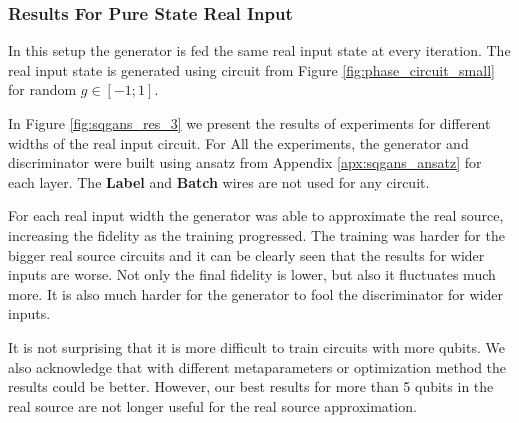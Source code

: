 \subsubsection{Results For Pure State Real Input}
In this setup the generator is fed the same real input state at every iteration.
The real input state is generated using circuit from Figure
\ref{fig:phase_circuit_small} for random $g \in [-1; 1]$.


In Figure \ref{fig:sqgans_res_3} we present the
results of experiments for different widths of the real input circuit. For All
the experiments, the generator and discriminator were built using ansatz
from Appendix \ref{apx:sqgans_ansatz} for each layer. The \textbf{Label} and
\textbf{Batch} wires are not used for any circuit.

For each real input width the generator was able to approximate the real source,
increasing the fidelity as the training progressed. The training was
harder for the bigger real source circuits and it can be clearly seen that
the results for wider inputs are worse. Not only the final fidelity is lower, but
also it fluctuates much more. It is also much harder for the generator to fool
the discriminator for wider inputs.

It is not surprising that it is more difficult to train circuits with more
qubits. We also acknowledge that with different metaparameters or optimization
method the results could be better. However, our best results for more than 5 qubits
in the real source are not longer useful for the real source approximation.

